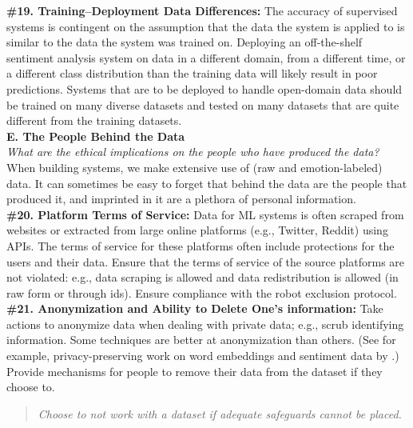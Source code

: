 \documentclass{clv3}
\begin{document}

\noindent \textbf{\#19. Training–Deployment Data Differences:} The accuracy of supervised systems is contingent on the assumption that the data the system is applied to is similar to the data the system was trained on. Deploying an off-the-shelf sentiment analysis system on data in a different domain, from a different time, or a different class distribution than the training data will likely result in poor predictions. Systems that are to be deployed to handle open-domain data should be trained on many diverse datasets and tested on many datasets that are quite different from the training datasets.\\[5pt]

\noindent \textbf{E. The People Behind the Data}\\[2pt]
\textit{What are the ethical implications on the people who have produced the data?}\\[4pt]
\noindent When building systems, we make extensive use of (raw and emotion-labeled) data. It can sometimes be easy to forget that behind the data are the people that produced it, and imprinted in it are a plethora of personal information.\\

\noindent \textbf{\#20. Platform Terms of Service:} Data for ML systems is often scraped from websites or extracted from large online platforms (e.g., Twitter, Reddit) using APIs. The terms of service for these platforms often include protections for the users and their data. Ensure that the terms of service of the source platforms are not violated: e.g., data scraping is allowed and data redistribution is allowed (in raw form or through ids). %
Ensure compliance with the robot exclusion protocol.\\ %

\noindent \textbf{\#21. Anonymization and Ability to Delete One’s information:} Take actions to anonymize data when dealing with private data; e.g., scrub identifying information. Some techniques are better at anonymization than others. (See for example, privacy-preserving work on word embeddings and sentiment data by \citet{thaine-penn-2021-chinese}.) Provide mechanisms for people to remove their data from the dataset if they choose to.\\[-20pt]
\begin{quote}
\textit{Choose to not work with a dataset if adequate safeguards cannot be placed.}
\end{quote}
\end{document}
